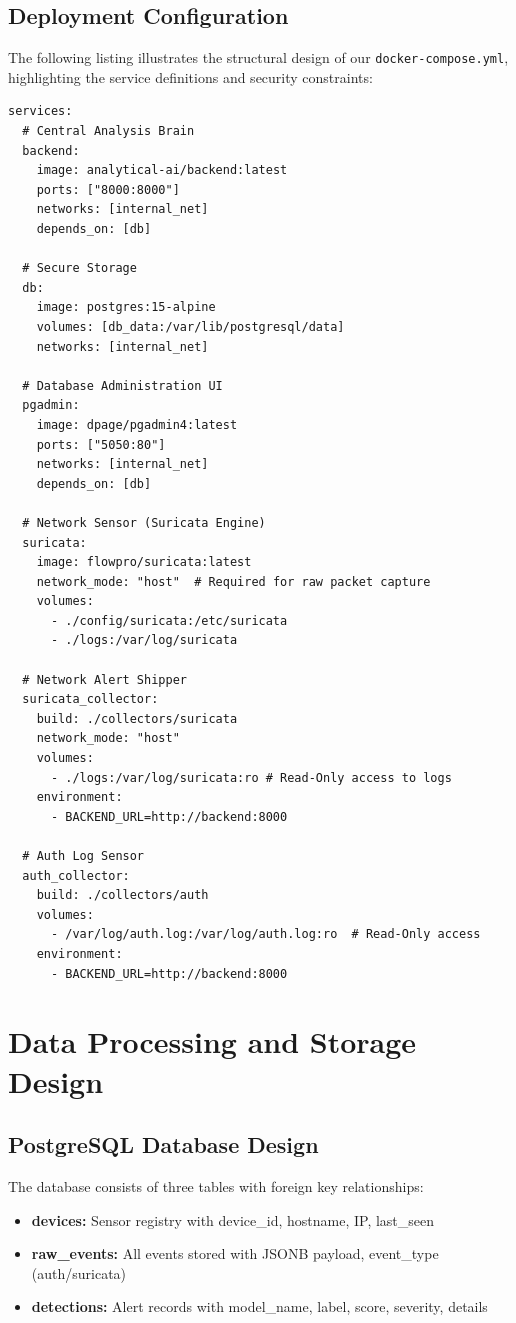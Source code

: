 \documentclass[12pt,a4paper]{report} %
\begin{document}
\subsection{Deployment Configuration}
The following listing illustrates the structural design of our \texttt{docker-compose.yml}, highlighting the service definitions and security constraints:

\begin{lstlisting}[style=yaml, caption=Docker Compose Services Architecture]
services:
  # Central Analysis Brain
  backend:
    image: analytical-ai/backend:latest
    ports: ["8000:8000"]
    networks: [internal_net]
    depends_on: [db]

  # Secure Storage
  db:
    image: postgres:15-alpine
    volumes: [db_data:/var/lib/postgresql/data]
    networks: [internal_net]

  # Database Administration UI
  pgadmin:
    image: dpage/pgadmin4:latest
    ports: ["5050:80"]
    networks: [internal_net]
    depends_on: [db]

  # Network Sensor (Suricata Engine)
  suricata:
    image: flowpro/suricata:latest
    network_mode: "host"  # Required for raw packet capture
    volumes:
      - ./config/suricata:/etc/suricata
      - ./logs:/var/log/suricata

  # Network Alert Shipper
  suricata_collector:
    build: ./collectors/suricata
    network_mode: "host"
    volumes:
      - ./logs:/var/log/suricata:ro # Read-Only access to logs
    environment:
      - BACKEND_URL=http://backend:8000

  # Auth Log Sensor
  auth_collector:
    build: ./collectors/auth
    volumes:
      - /var/log/auth.log:/var/log/auth.log:ro  # Read-Only access
    environment:
      - BACKEND_URL=http://backend:8000
\end{lstlisting}

\section{Data Processing and Storage Design}
\label{sec:data-processing}

\subsection{PostgreSQL Database Design}
The database consists of three tables with foreign key relationships:

\begin{itemize}
	\item \textbf{devices:} Sensor registry with device\_id, hostname, IP, last\_seen
	\item \textbf{raw\_events:} All events stored with JSONB payload, event\_type (auth/suricata)
	\item \textbf{detections:} Alert records with model\_name, label, score, severity, details
\end{itemize}
\end{document}

